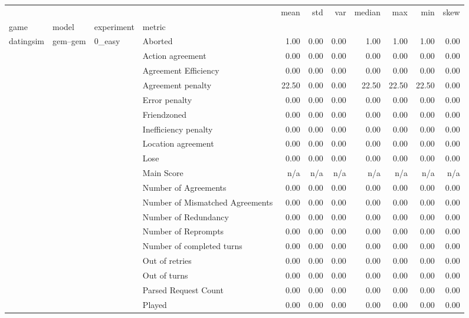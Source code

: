 \begin{tabular}{llllrrrrrrr}
\toprule
 &  &  &  & mean & std & var & median & max & min & skew \\
game & model & experiment & metric &  &  &  &  &  &  &  \\
\midrule
\multirow[t]{2646}{*}{datingsim} & \multirow[t]{378}{*}{gem--gem} & \multirow[t]{27}{*}{0_easy} & Aborted & 1.00 & 0.00 & 0.00 & 1.00 & 1.00 & 1.00 & 0.00 \\
 &  &  & Action agreement & 0.00 & 0.00 & 0.00 & 0.00 & 0.00 & 0.00 & 0.00 \\
 &  &  & Agreement Efficiency & 0.00 & 0.00 & 0.00 & 0.00 & 0.00 & 0.00 & 0.00 \\
 &  &  & Agreement penalty & 22.50 & 0.00 & 0.00 & 22.50 & 22.50 & 22.50 & 0.00 \\
 &  &  & Error penalty & 0.00 & 0.00 & 0.00 & 0.00 & 0.00 & 0.00 & 0.00 \\
 &  &  & Friendzoned & 0.00 & 0.00 & 0.00 & 0.00 & 0.00 & 0.00 & 0.00 \\
 &  &  & Inefficiency penalty & 0.00 & 0.00 & 0.00 & 0.00 & 0.00 & 0.00 & 0.00 \\
 &  &  & Location agreement & 0.00 & 0.00 & 0.00 & 0.00 & 0.00 & 0.00 & 0.00 \\
 &  &  & Lose & 0.00 & 0.00 & 0.00 & 0.00 & 0.00 & 0.00 & 0.00 \\
 &  &  & Main Score & n/a & n/a & n/a & n/a & n/a & n/a & n/a \\
 &  &  & Number of Agreements & 0.00 & 0.00 & 0.00 & 0.00 & 0.00 & 0.00 & 0.00 \\
 &  &  & Number of Mismatched Agreements & 0.00 & 0.00 & 0.00 & 0.00 & 0.00 & 0.00 & 0.00 \\
 &  &  & Number of Redundancy & 0.00 & 0.00 & 0.00 & 0.00 & 0.00 & 0.00 & 0.00 \\
 &  &  & Number of Reprompts & 0.00 & 0.00 & 0.00 & 0.00 & 0.00 & 0.00 & 0.00 \\
 &  &  & Number of completed turns & 0.00 & 0.00 & 0.00 & 0.00 & 0.00 & 0.00 & 0.00 \\
 &  &  & Out of retries & 0.00 & 0.00 & 0.00 & 0.00 & 0.00 & 0.00 & 0.00 \\
 &  &  & Out of turns & 0.00 & 0.00 & 0.00 & 0.00 & 0.00 & 0.00 & 0.00 \\
 &  &  & Parsed Request Count & 0.00 & 0.00 & 0.00 & 0.00 & 0.00 & 0.00 & 0.00 \\
 &  &  & Played & 0.00 & 0.00 & 0.00 & 0.00 & 0.00 & 0.00 & 0.00 \\

\end{tabular}
